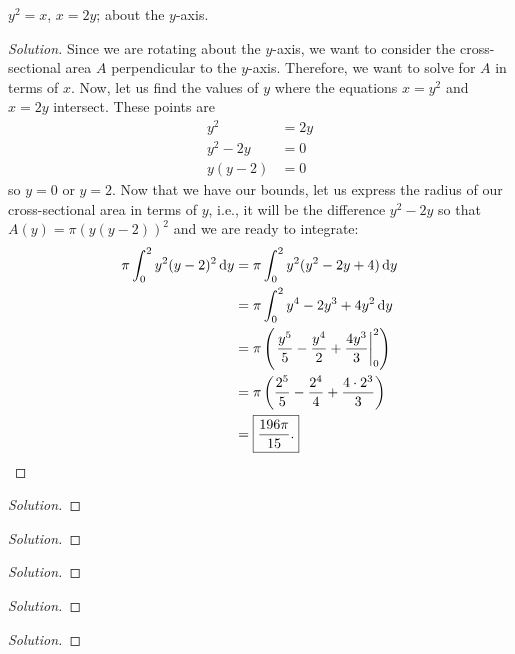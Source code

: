 \begin{problem}
$y^2=x$, $x=2y$; about the $y$-axis.
\end{problem}
\begin{proof}[Solution]
Since we are rotating about the $y$-axis, we want to consider the
cross-sectional area $A$ perpendicular to the $y$-axis. Therefore, we want
to solve for $A$ in terms of $x$. Now, let us find the values of $y$ where
the equations $x=y^2$ and $x=2y$ intersect. These points are
\begin{align*}
y^2&=2y\\
y^2-2y&=0\\
y(y-2)&=0
\end{align*}
so $y=0$ or $y=2$. Now that we have our bounds, let us express the radius
of our cross-sectional area in terms of $y$, i.e., it will be the
difference $y^2-2y$ so that $A(y)=\pi (y(y-2))^2$ and we are ready to
integrate:
\begin{align*}
\pi\int_0^2y^2(y-2)^2\,\mathrm{d} y
&=\pi\int_0^2y^2(y^2-2y+4)\,\mathrm{d} y\\
&=\pi\int_0^2y^4-2y^3+4y^2\,\mathrm{d} y\\
&=\pi\left(\left.\frac{y^5}{5}-\frac{y^4}{2}+\frac{4y^3}{3}\right|_0^2\right)\\
&=\pi\left(\frac{2^5}{5}-\frac{2^4}{4}+\frac{4\cdot 2^3}{3}\right)\\
&=\boxed{\frac{196\pi}{15}.}
\end{align*}
\end{proof}

\begin{problem}

\end{problem}
\begin{proof}[Solution]
\end{proof}

\begin{problem}

\end{problem}
\begin{proof}[Solution]
\end{proof}

\begin{problem}

\end{problem}
\begin{proof}[Solution]
\end{proof}

\begin{problem}

\end{problem}
\begin{proof}[Solution]
\end{proof}

\begin{problem}

\end{problem}
\begin{proof}[Solution]
\end{proof}

